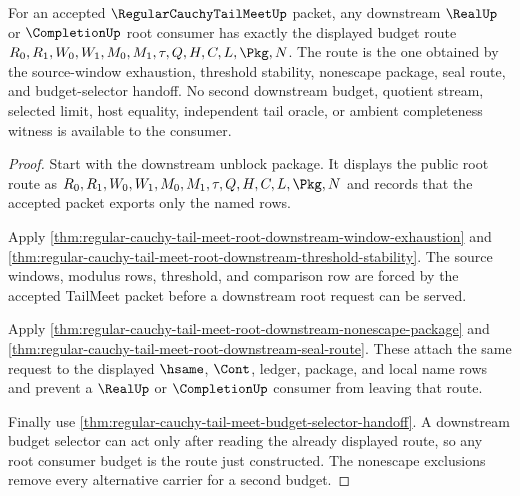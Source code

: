 \begin{theorem}
\label{thm:regular-cauchy-tail-meet-root-consumer-budget-uniqueness}
For an accepted $\RegularCauchyTailMeetUp$ packet, any downstream $\RealUp$ or
$\CompletionUp$ root consumer has exactly the displayed budget route
$R_0,R_1,W_0,W_1,M_0,M_1,\tau,Q,H,C,L,\Pkg,N$. The route is the one obtained by
the source-window exhaustion, threshold stability, nonescape package, seal
route, and budget-selector handoff. No second downstream budget, quotient
stream, selected limit, host equality, independent tail oracle, or ambient
completeness witness is available to the consumer.
\end{theorem}
\begin{proof}
Start with the downstream unblock package. It displays the public root route as
$R_0,R_1,W_0,W_1,M_0,M_1,\tau,Q,H,C,L,\Pkg,N$ and records that the accepted
packet exports only the named rows.

Apply
\autoref{thm:regular-cauchy-tail-meet-root-downstream-window-exhaustion} and
\autoref{thm:regular-cauchy-tail-meet-root-downstream-threshold-stability}. The
source windows, modulus rows, threshold, and comparison row are forced by the
accepted TailMeet packet before a downstream root request can be served.

Apply
\autoref{thm:regular-cauchy-tail-meet-root-downstream-nonescape-package} and
\autoref{thm:regular-cauchy-tail-meet-root-downstream-seal-route}. These attach
the same request to the displayed $\hsame$, $\Cont$, ledger, package, and local
name rows and prevent a $\RealUp$ or $\CompletionUp$ consumer from leaving that
route.

Finally use
\autoref{thm:regular-cauchy-tail-meet-budget-selector-handoff}. A downstream
budget selector can act only after reading the already displayed route, so any
root consumer budget is the route just constructed. The nonescape exclusions
remove every alternative carrier for a second budget.
\end{proof}

